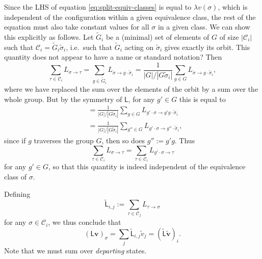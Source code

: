 \documentclass[10pt]{article}
\newcommand{\defeq}{:=}
\newcommand{\vv}{\mathbf{v}}
\renewcommand{\v}[1]{v(#1)}
\newcommand{\LL}{\mathsf{L}}
\newcommand{\tL}{\tilde{\LL}}
\newcommand{\tv}{\tilde{v}}
\newcommand{\tvv}{\tilde{\vv}}
\renewcommand{\L}[2]{L_{#2 \to #1}}  %
\newcommand{\size}[1]{\left| #1 \right|}
\newcommand{\class}{\mathcal{C}}
\newcommand{\ts}{\tilde{\sigma}}
\newcommand{\tG}{\tilde{G}}
\newcommand{\transp}{^{\text{\small T}}}
\newcommand{\comment}[1]{{\color{red}#1}}
\begin{document}
Since the LHS of equation \eqref{eq:split-equiv-classes} is equal to $\lambda
\v{\sigma}$, which is independent of the configuration within a given 
equivalence class, the rest of the equation must also take constant values for
all $\sigma$ in a given class.  We can show this explicitly as follows.  Let
$\tG_i$ be a (minimal) set
of elements of $G$ of size $\size{\class_i}$ such that $\class_i = \tG_i \ts_i$,
i.e.\ such that $\tG_i$ acting on $\ts_i$ gives exactly its orbit.
\comment{This quantity does not appear to have a name or standard notation?}
Then
\begin{equation}
\sum_{\tau \in \class_i} \L{\tau}{\sigma} = \sum_{g \in \tG_i} \L{g\cdot \ts_i}
{\sigma}
= \frac{1}{\size{G}/\size{G \ts_i}} \sum_{g \in G} \L{g\cdot \ts_i}{\sigma},
\end{equation}
where we have replaced the sum over the elements of the orbit by a sum
over the whole group.
But by the symmetry of $\LL$, for any $g' \in G$ this is equal to
\begin{align}
&= \frac{1}{\size{G}/\size{G \ts_i}} \sum_{g \in G} 
\L{g'g\cdot \ts_i} {g' \cdot \sigma} \\
&= \frac{1}{\size{G}/\size{G \ts_i}} \sum_{g'' \in G} 
\L{g''\cdot \ts_i}{g' \cdot \sigma},
\end{align}
since if $g$ traverses the group $G$, then so does $g'' \defeq g'g$.
Thus
\begin{equation}
\sum_{\tau \in \class_i} \L{\tau}{\sigma} = \sum_{\tau \in \class_i}
\L{\tau}{g' \cdot \sigma}
\end{equation}
for any $g' \in G$, so that this quantity is indeed independent of the
equivalence class of $\sigma$.

Defining
\begin{equation} \label{eq:definition-reduced-matrix}
\tL_{i,j} \defeq \sum_{\tau \in \class_j} \L{\sigma}{\tau}
\end{equation}
for any $\sigma \in \class_i$,
we thus conclude that 
\begin{equation}
(\LL %
\vv)_{\sigma} = \sum_j \tL_{i,j} \tv_j = (\tL %
\tvv)_{i}.
\end{equation}
Note that we must sum over \emph{departing} states.
\end{document}
